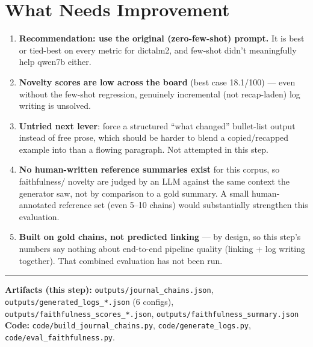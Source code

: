 \documentclass[11pt,a4paper]{article}
\begin{document}
\section{What Needs Improvement}

\begin{enumerate}[leftmargin=1.4em]
  \item \textbf{Recommendation: use the original (zero-few-shot) prompt.} It is best or
        tied-best on every metric for dictalm2, and few-shot didn't meaningfully help qwen7b
        either.
  \item \textbf{Novelty scores are low across the board} (best case 18.1/100) --- even without
        the few-shot regression, genuinely incremental (not recap-laden) log writing is unsolved.
  \item \textbf{Untried next lever}: force a structured ``what changed'' bullet-list output
        instead of free prose, which should be harder to blend a copied/recapped example into
        than a flowing paragraph. Not attempted in this step.
  \item \textbf{No human-written reference summaries exist} for this corpus, so faithfulness/
        novelty are judged by an LLM against the same context the generator saw, not by
        comparison to a gold summary. A small human-annotated reference set (even 5--10 chains)
        would substantially strengthen this evaluation.
  \item \textbf{Built on gold chains, not predicted linking} --- by design, so this step's
        numbers say nothing about end-to-end pipeline quality (linking + log writing together).
        That combined evaluation has not been run.
\end{enumerate}

\vspace{1.5em}
\hrule
\vspace{0.4em}
\raggedright
{\small
\textbf{Artifacts (this step):} \newline
\texttt{outputs/journal\_chains.json}, \texttt{outputs/generated\_logs\_*.json} (6 configs), \newline
\texttt{outputs/faithfulness\_scores\_*.json}, \texttt{outputs/faithfulness\_summary.json} \newline
\textbf{Code:} \texttt{code/build\_journal\_chains.py}, \texttt{code/generate\_logs.py},
\texttt{code/eval\_faithfulness.py}.
}
\end{document}
